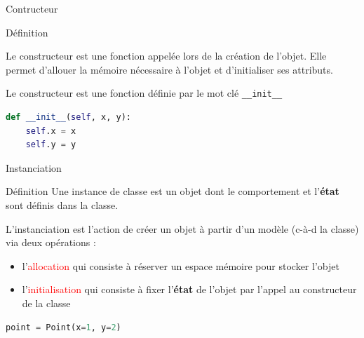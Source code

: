 \documentclass[10pt]{beamer}
\begin{document}
\begin{frame}[fragile]{Contructeur}

  \begin{block}{Définition}
    \medskip

    Le constructeur est une fonction appelée lors de la création de l'objet.
    Elle permet d'allouer la mémoire nécessaire à l'objet et d'initialiser ses attributs.

    \medskip
    Le constructeur est une fonction définie par le mot clé \texttt{\_\_init\_\_}
  \end{block}
\begin{lstlisting}[language=Python, numbers=none]
def __init__(self, x, y):
    self.x = x
    self.y = y
\end{lstlisting}
\end{frame}



\begin{frame}[fragile]{Instanciation}

  \begin{block}{Définition}
    \medskip
    Une instance de classe est un objet dont le comportement et l'\textbf{état} sont définis dans la classe.

    L'instanciation est l'action de créer un objet à partir d'un modèle (c-à-d la classe) via deux opérations :
    \begin{itemize}
      \item l'\textcolor{red}{allocation} qui consiste à réserver un espace mémoire pour stocker l'objet
      \item l'\textcolor{red}{initialisation} qui consiste à fixer l'\textbf{état} de l'objet par l'appel au constructeur de la classe
    \end{itemize}

  \end{block}
\begin{lstlisting}[language=Python, numbers=none]
point = Point(x=1, y=2)
\end{lstlisting}
\end{frame}
\end{document}
